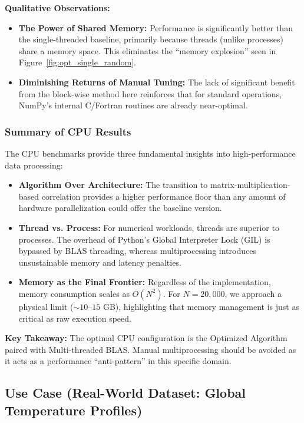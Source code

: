 \textbf{Qualitative Observations:}
\begin{itemize}
    \item \textbf{The Power of Shared Memory:} Performance is significantly better than the single-threaded baseline, primarily because threads (unlike processes) share a memory space. This eliminates the ``memory explosion'' seen in Figure~\ref{fig:opt_single_random}.
    
    \item \textbf{Diminishing Returns of Manual Tuning:} The lack of significant benefit from the block-wise method here reinforces that for standard operations, NumPy’s internal C/Fortran routines are already near-optimal.
\end{itemize}

\subsubsection{Summary of CPU Results}

The CPU benchmarks provide three fundamental insights into high-performance data processing:

\begin{itemize}
    \item \textbf{Algorithm Over Architecture:} The transition to matrix-multiplication-based correlation provides a higher performance floor than any amount of hardware parallelization could offer the baseline version.
    
    \item \textbf{Thread vs. Process:} For numerical workloads, threads are superior to processes. The overhead of Python’s Global Interpreter Lock (GIL) is bypassed by BLAS threading, whereas multiprocessing introduces unsustainable memory and latency penalties.
    
    \item \textbf{Memory as the Final Frontier:} Regardless of the implementation, memory consumption scales as $O(N^2)$. For $N=20{,}000$, we approach a physical limit ($\sim 10$--$15$ GB), highlighting that memory management is just as critical as raw execution speed.
\end{itemize}

\textbf{Key Takeaway:} The optimal CPU configuration is the Optimized Algorithm paired with Multi-threaded BLAS. Manual multiprocessing should be avoided as it acts as a performance ``anti-pattern'' in this specific domain.


\subsection{Use Case (Real-World Dataset: Global Temperature Profiles)}

